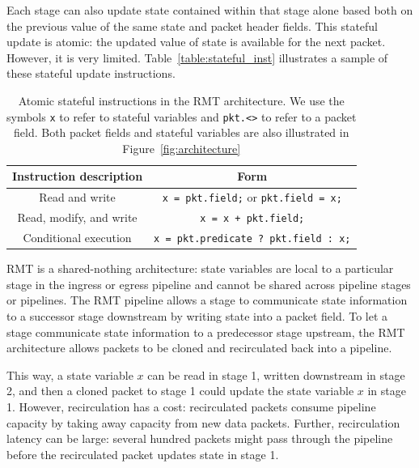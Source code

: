 Each stage can also update state contained within that stage alone based both
on the previous value of the same state and packet header fields. This stateful
update is atomic: the updated value of state is available for the next packet.
However, it is very limited. Table~\ref{table:stateful_inst} illustrates a
sample of these stateful update instructions.

\begin{table}
\begin{small}
\begin{tabular}{|c|c|}
\hline
Instruction description & Form \\
\hline
Read and write & \texttt{x = pkt.field;} or \texttt{pkt.field = x;} \\
\hline
Read, modify, and write & \texttt{x = x + pkt.field;} \\
\hline
Conditional execution & \texttt{x = pkt.predicate ? pkt.field : x;} \\
\hline
\end{tabular}
\end{small}
\caption{Atomic stateful instructions in the RMT architecture. We use the
symbols {\tt x} to refer to stateful variables and {\tt pkt.<>} to refer to a
packet field. Both packet fields and stateful variables are also illustrated in
Figure~\ref{fig:architecture}}

\label{t:stateful_inst}
\end{table}

RMT is a shared-nothing architecture: state variables are local to a particular
stage in the ingress or egress pipeline and cannot be shared across pipeline
stages or pipelines. The RMT pipeline allows a stage to communicate state
information to a successor stage downstream by writing state into a packet
field. To let a stage communicate state information to a predecessor stage
upstream, the RMT architecture allows packets to be cloned and recirculated
back into a pipeline.

This way, a state variable $x$ can be read in stage 1, written downstream in stage
2, and then a cloned packet to stage 1 could update the state variable $x$ in stage 1.
However, recirculation has a cost: recirculated packets consume pipeline
capacity by taking away capacity from new data packets. Further, recirculation
latency can be large: several hundred packets might pass through the pipeline
before the recirculated packet updates state in stage 1.
